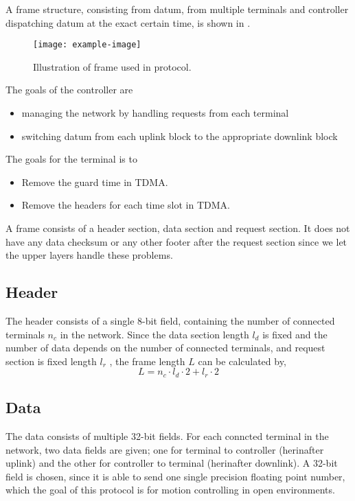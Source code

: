 ﻿\documentclass[twocolumn,9pt]{ltjsarticle}
\renewcommand{\ref}{\Cref}
\begin{document}
A frame structure, consisting from datum, from multiple terminals and controller dispatching datum at the exact certain time, is shown in \ref{fig:frame}.

\begin{figure}[tb]
  \centering
  \texttt{[image: example-image]}
  \caption{\label{fig:frame}
    Illustration of frame used in protocol.
  }
\end{figure}

The goals of the controller are
\begin{itemize}
\item managing the network by handling requests from each terminal
\item switching datum from each uplink block to the appropriate downlink block
\end{itemize}

The goals for the terminal is to 

\begin{itemize}
\item Remove the guard time in TDMA.
\item Remove the headers for each time slot in TDMA.
\end{itemize}

A frame consists of a header section, data section and request section.
It does not have any data checksum or any other footer after the request section since we let the upper layers handle these problems.

\subsection{Header}
The header consists of a single 8-bit field, containing the number of connected terminals $n_{c}$ in the network.
Since the data section length $l_d$ is fixed and the number of data depends on the number of connected terminals, and request section is fixed length $l_r$ , the frame length $L$ can be calculated by,
\begin{equation}
  \label{}
  L = n_c \cdot l_d \cdot 2 + l_r \cdot 2
\end{equation}

\subsection{Data}
The data consists of multiple 32-bit fields.
For each conncted terminal in the network, two data fields are given; one for terminal to controller (herinafter uplink) and the other for controller to terminal (herinafter downlink).
A 32-bit field is chosen, since it is able to send one single precision floating point number, which the goal of this protocol is for motion controlling in open environments.
\end{document}
